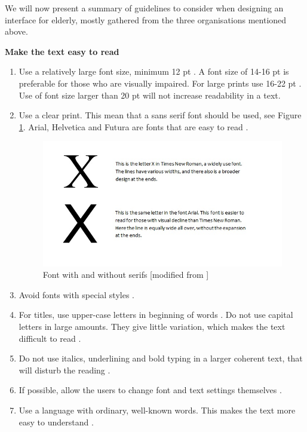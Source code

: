 We will now present a summary of guidelines to consider when designing an interface for elderly, mostly gathered from the three organisations mentioned above.


\textbf{Make the text easy to read}
\begin{enumerate}[{o}.1]
\item Use a relatively large font size, minimum 12 pt \cite{blindeforbundetTekst} \cite{evengrounds}. A font size of 14-16 pt is preferable for those who are visually impaired. For large prints use 16-22 pt \cite{actionforblindpeopleTekst}. Use of font size larger than 20 pt will not increase readability in a text.     
\item Use a clear print. This mean that a sans serif font should be used, see Figure \ref{fig:fonts}. Arial, Helvetica and Futura are fonts that are easy to read \cite{actionforblindpeopleTekst}.
\begin{figure} [ht!]
\centering
\includegraphics[scale=0.75]{fontExample.jpg}
\caption[Fonts]{Font with and without serifs [modified from \cite{blindeforbundetTekst}]}
\label{fig:fonts}
\end{figure}

\item Avoid fonts with special styles \cite{blindeforbundetTekst} \cite{actionforblindpeopleTekst}.
\item For titles, use upper-case letters in beginning of words \cite{actionforblindpeopleTekst}. Do not use capital letters in large amounts. They give little variation, which makes the text difficult to read \cite{blindeforbundetTekst}. 
\item Do not use italics, underlining and bold typing in a larger coherent text, that will disturb the reading \cite{blindeforbundetTekst} \cite{actionforblindpeopleTekst}.  
\item If possible, allow the users to change font and text settings themselves \cite{blindeforbundetTekst} \cite{w3cTekst}. 
\item Use a language with ordinary, well-known words. This makes the text more easy to understand \cite{w3cTekst}. \\ 



\end{enumerate}
